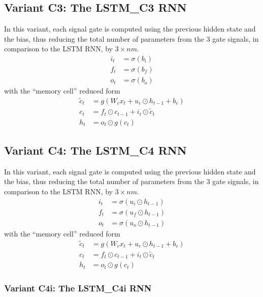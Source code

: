\documentclass{article}
\begin{document}
{{{\subsection{Variant C3: The LSTM\_C3 RNN}
In this variant, each signal gate is computed using the previous hidden state and the bias, thus reducing the total number of parameters from the 3 gate signals, in comparison to the LSTM RNN, by $3 \times nm$.
\begin{align}
	i_t &= \sigma(b_i)\\
	f_t &= \sigma(b_f)\\
	o_t &= \sigma(b_o)
\end{align}
with the ``memory cell'' reduced form
\begin{align}
	\label{eqn:C202}	\tilde{c}_t &= g(W_c x_t + u_c \odot  h_{t-1} + b_c)\\
	\label{eqn:C302}	 c_t &= f_t \odot c_{t-1} + i_t \odot \tilde{c}_t\\
	\label{eqn:C402}	h_t &= o_t \odot g(c_t)
\end{align}

\subsection{Variant C4: The LSTM\_C4 RNN}
In this variant, each signal gate is computed using the previous hidden state and the bias, thus reducing the total number of parameters from the 3 gate signals, in comparison to the LSTM RNN, by $3 \times nm$.
\begin{align}
	i_t &= \sigma(u_i \odot  h_{t-1})\\
	f_t &= \sigma(u_f \odot h_{t-1})\\
	o_t &= \sigma(u_o \odot  h_{t-1})
\end{align}
with the ``memory cell'' reduced form
\begin{align}
	\label{eqn:CC202}	\tilde{c}_t &= g(W_c x_t + u_c \odot  h_{t-1} + b_c)\\
	\label{eqn:CC302}	 c_t &= f_t \odot c_{t-1} + i_t \odot \tilde{c}_t\\
	\label{eqn:CC402}	h_t &= o_t \odot g(c_t)
\end{align}

\subsubsection {Variant C4i: The LSTM\_C4i RNN}

}}}
\end{document}

